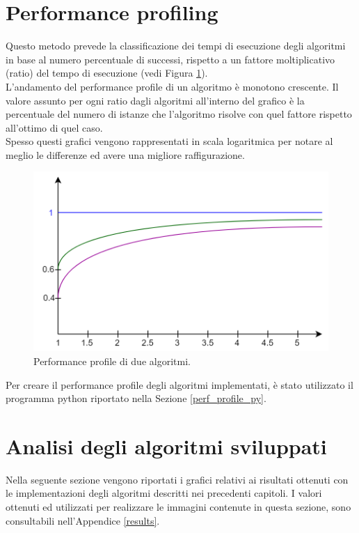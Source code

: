 \section{Performance profiling}
Questo metodo prevede la classificazione dei tempi di esecuzione degli algoritmi in base al numero percentuale di successi, rispetto a un fattore moltiplicativo (ratio) del tempo di esecuzione (vedi Figura \ref{perf_profile}).\\
L'andamento del performance profile di un algoritmo è monotono crescente. Il valore assunto per ogni ratio dagli algoritmi all'interno del grafico è la percentuale del numero di istanze che l'algoritmo risolve con quel fattore rispetto all'ottimo di quel caso.\\
Spesso questi grafici vengono rappresentati in scala logaritmica per notare al meglio le differenze ed avere una migliore raffigurazione.\\
\begin{figure}[h] 
\begin{center} 
  \includegraphics[scale=0.3]{Images/perf_profile} 
  \caption{\footnotesize{Performance profile di due algoritmi.}}
  \label{perf_profile} 
\end{center} 
\end{figure}
Per creare il performance profile degli algoritmi implementati, è stato utilizzato il programma python riportato nella Sezione \ref{perf_profile_py}. 

\section{Analisi degli algoritmi sviluppati}
Nella seguente sezione vengono riportati i grafici relativi ai risultati ottenuti con le implementazioni degli algoritmi descritti nei precedenti capitoli. I valori ottenuti ed utilizzati per realizzare le immagini contenute in questa sezione, sono consultabili nell'Appendice \ref{results}.
